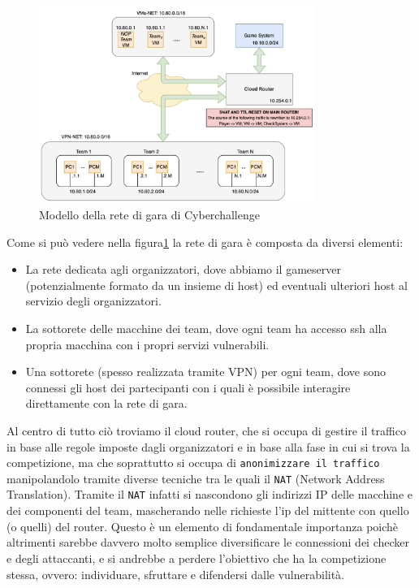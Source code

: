 \begin{figure}[H]
    \centering
    \includegraphics[width=0.8\textwidth]{images/chapter1/ccit_network.png}
    \caption{Modello della rete di gara di Cyberchallenge}\label{fig:ccit_network}
\end{figure}

Come si può vedere nella figura\ref{fig:ccit_network} la rete di gara è composta da diversi elementi:
\begin{itemize}
    \setlength{\itemsep}{2pt}
    \setlength{\parskip}{2pt}
    \item La rete dedicata agli organizzatori, dove abbiamo il gameserver (potenzialmente formato da un insieme di host) ed eventuali ulteriori host al servizio degli organizzatori.
    \item La sottorete delle macchine dei team, dove ogni team ha accesso ssh alla propria macchina con i propri servizi vulnerabili.
    \item Una sottorete (spesso realizzata tramite VPN) per ogni team, dove sono connessi gli host dei partecipanti con i quali è possibile interagire direttamente con la rete di gara.
\end{itemize}

Al centro di tutto ciò troviamo il cloud router, che si occupa di gestire il traffico in base alle regole imposte dagli organizzatori e in base alla fase in cui si trova la competizione,
ma che soprattutto si occupa di \texttt{anonimizzare il traffico} manipolandolo tramite diverse tecniche tra le quali il \texttt{NAT} (Network Address Translation).
Tramite il \texttt{NAT} infatti si nascondono gli indirizzi IP delle macchine e dei componenti del team, mascherando nelle richieste l'ip del mittente con quello (o quelli) del router.
Questo è un elemento di fondamentale importanza poichè altrimenti sarebbe davvero molto semplice diversificare le connessioni dei checker e degli attaccanti, e si andrebbe a perdere l'obiettivo che ha
la competizione stessa, ovvero: individuare, sfruttare e difendersi dalle vulnerabilità.\\

